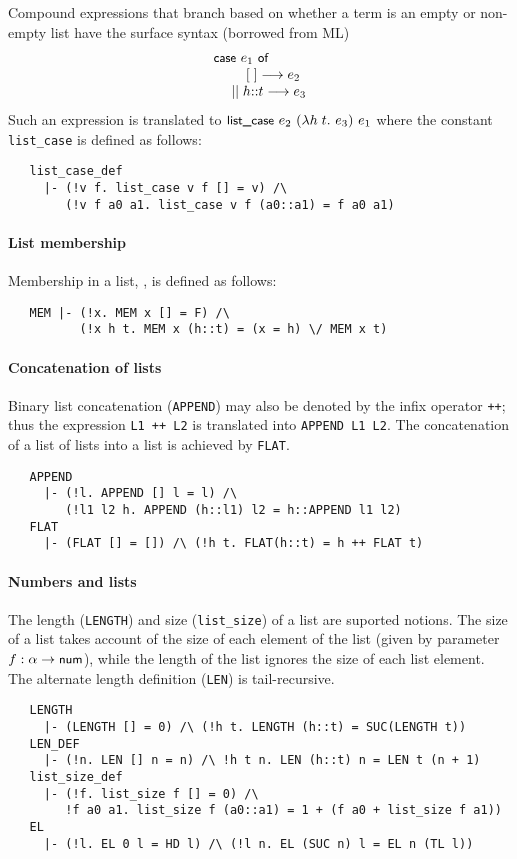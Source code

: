 Compound \HOL{} expressions that branch based on
whether a term is an empty or non-empty list have the
surface syntax (borrowed from ML)
\[
\begin{array}{l}
\mbox{\small{\textbf{\sf{case}}}}\ e_1 \ \mbox{\small{\textbf{\sf{of}}}} \\
{~~~~~~~}  \mathbf{[} \;\mathbf{]} \longrightarrow e_2 \\
{~~~}  \mid\mid {h}\mathbf{:}\mathbf{:}{t} \longrightarrow e_3
\end{array}
\]
%
Such an expression is translated to
$\konst{list\_case}\ e_2\ (\lambda h\; t.\ e_3)\ e_1$ where the constant
{\small\verb+list_case+} is defined as follows:
{\small
\begin{verbatim}
   list_case_def
     |- (!v f. list_case v f [] = v) /\
        (!v f a0 a1. list_case v f (a0::a1) = f a0 a1)
\end{verbatim}
}

\paragraph{List membership}

Membership in a list, , is defined as follows:
%
{\small
\begin{verbatim}
   MEM |- (!x. MEM x [] = F) /\
          (!x h t. MEM x (h::t) = (x = h) \/ MEM x t)
\end{verbatim}
}

\paragraph {Concatenation of lists}

Binary list concatenation ({\small\verb+APPEND+}) may also be denoted by
the infix operator {\small\verb|++|}; thus the expression
{\small\verb|L1 ++ L2|} is translated into {\small\verb+APPEND L1 L2+}.
The concatenation of a list of lists into a list is achieved by
{\small\verb+FLAT+}.
%
{\small
\begin{verbatim}
   APPEND
     |- (!l. APPEND [] l = l) /\
        (!l1 l2 h. APPEND (h::l1) l2 = h::APPEND l1 l2)
   FLAT
     |- (FLAT [] = []) /\ (!h t. FLAT(h::t) = h ++ FLAT t)
\end{verbatim}
}

\paragraph {Numbers and lists}

The length ({\small\verb+LENGTH+}) and size ({\small\verb+list_size+})
of a list are suported notions. The size of a list takes account of
the size of each element of the list (given by parameter
$f:\alpha\to\mbox{\small{\textbf{\sf{num}}}}$), while the length of the list ignores the
size of each list element. The alternate length definition
({\small\verb+LEN+}) is tail-recursive.
%
{\small
\begin{verbatim}
   LENGTH
     |- (LENGTH [] = 0) /\ (!h t. LENGTH (h::t) = SUC(LENGTH t))
   LEN_DEF
     |- (!n. LEN [] n = n) /\ !h t n. LEN (h::t) n = LEN t (n + 1)
   list_size_def
     |- (!f. list_size f [] = 0) /\
        !f a0 a1. list_size f (a0::a1) = 1 + (f a0 + list_size f a1))
   EL
     |- (!l. EL 0 l = HD l) /\ (!l n. EL (SUC n) l = EL n (TL l))
\end{verbatim}
}

